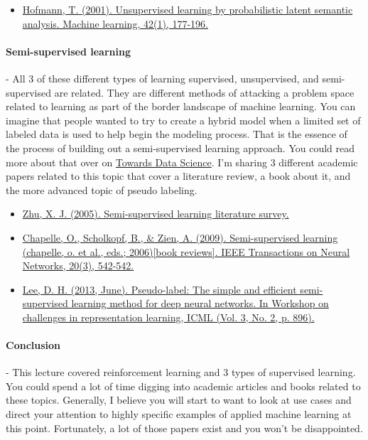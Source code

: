 \documentclass{article}
\begin{document}
\begin{itemize}
\item \href{https://link.springer.com/content/pdf/10.1023/A:1007617005950.pdf}{Hofmann, T. (2001). Unsupervised learning by probabilistic latent semantic analysis. Machine learning, 42(1), 177-196.} \cite{hofmann2001unsupervised}
\end{itemize}

\paragraph{Semi-supervised learning} - All 3 of these different types of learning supervised, unsupervised, and semi-supervised are related. They are different methods of attacking a problem space related to learning as part of the border landscape of machine learning. You can imagine that people wanted to try to create a hybrid model when a limited set of labeled data is used to help begin the modeling process. That is the essence of the process of building out a semi-supervised learning approach. You could read more about that over on \href{https://towardsdatascience.com/supervised-learning-but-a-lot-better-semi-supervised-learning-a42dff534781}{Towards Data Science}. I’m sharing 3 different academic papers related to this topic that cover a literature review, a book about it, and the more advanced topic of pseudo labeling. 

\begin{itemize}
\item \href{https://minds.wisconsin.edu/bitstream/handle/1793/60444/TR1530.pdf?sequence=1 }{Zhu, X. J. (2005). Semi-supervised learning literature survey. } \cite{zhu2005semi}
\item \href{https://ieeexplore.ieee.org/stamp/stamp.jsp?arnumber=4787647}{Chapelle, O., Scholkopf, B., \& Zien, A. (2009). Semi-supervised learning (chapelle, o. et al., eds.; 2006)[book reviews]. IEEE Transactions on Neural Networks, 20(3), 542-542.} \cite{chapelle2009semi}
\item \href{https://www.kaggle.com/blobs/download/forum-message-attachment-files/746/pseudo_label_final.pdf}{Lee, D. H. (2013, June). Pseudo-label: The simple and efficient semi-supervised learning method for deep neural networks. In Workshop on challenges in representation learning, ICML (Vol. 3, No. 2, p. 896).} \cite{lee2013pseudo}
\end{itemize}

\paragraph{Conclusion} - This lecture covered reinforcement learning and 3 types of supervised learning. You could spend a lot of time digging into academic articles and books related to these topics. Generally, I believe you will start to want to look at use cases and direct your attention to highly specific examples of applied machine learning at this point. Fortunately, a lot of those papers exist and you won’t be disappointed. 
\end{document}
